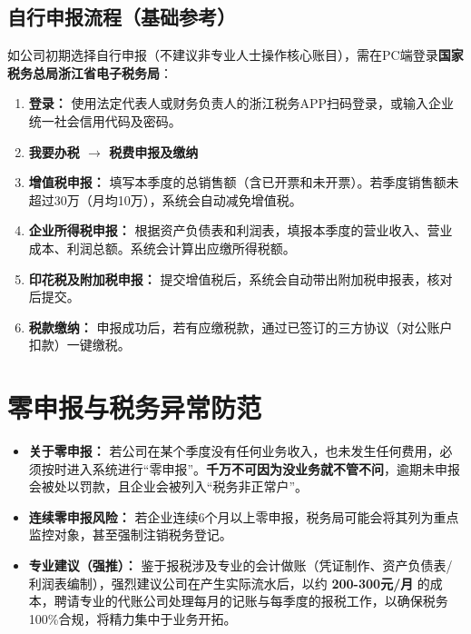 \documentclass[a4paper, 12pt]{ctexart}
\begin{document}
\subsection{自行申报流程（基础参考）}
如公司初期选择自行申报（不建议非专业人士操作核心账目），需在PC端登录\textbf{国家税务总局浙江省电子税务局}：
\begin{enumerate}
    \item \textbf{登录：} 使用法定代表人或财务负责人的浙江税务APP扫码登录，或输入企业统一社会信用代码及密码。
    \item \textbf{我要办税 $\rightarrow$ 税费申报及缴纳}
    \item \textbf{增值税申报：} 填写本季度的总销售额（含已开票和未开票）。若季度销售额未超过30万（月均10万），系统会自动减免增值税。
    \item \textbf{企业所得税申报：} 根据资产负债表和利润表，填报本季度的营业收入、营业成本、利润总额。系统会计算出应缴所得税额。
    \item \textbf{印花税及附加税申报：} 提交增值税后，系统会自动带出附加税申报表，核对后提交。
    \item \textbf{税款缴纳：} 申报成功后，若有应缴税款，通过已签订的三方协议（对公账户扣款）一键缴税。
\end{enumerate}

\section{零申报与税务异常防范}
\begin{itemize}
    \item \textbf{关于零申报：} 若公司在某个季度没有任何业务收入，也未发生任何费用，必须按时进入系统进行“零申报”。\textbf{千万不可因为没业务就不管不问}，逾期未申报会被处以罚款，且企业会被列入“税务非正常户”。
    \item \textbf{连续零申报风险：} 若企业连续6个月以上零申报，税务局可能会将其列为重点监控对象，甚至强制注销税务登记。
    \item \textbf{专业建议（强推）：} 鉴于报税涉及专业的会计做账（凭证制作、资产负债表/利润表编制），强烈建议公司在产生实际流水后，以约 \textbf{200-300元/月} 的成本，聘请专业的代账公司处理每月的记账与每季度的报税工作，以确保税务100\%合规，将精力集中于业务开拓。
\end{itemize}
\end{document}
